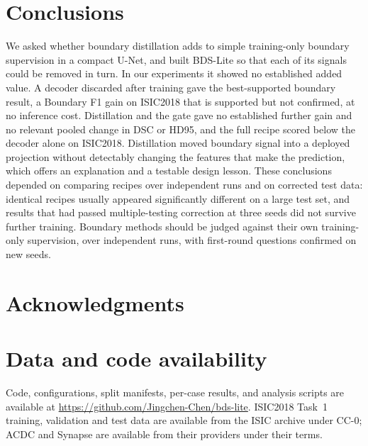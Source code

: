 \documentclass[fleqn,10pt,lineno]{wlpeerj}
\begin{document}
\section*{Conclusions}
We asked whether boundary distillation adds to simple training-only boundary supervision in a compact U-Net, and built BDS-Lite so that each of its signals could be removed in turn. In our experiments it showed no established added value. A decoder discarded after training gave the best-supported boundary result, a Boundary F1 gain on ISIC2018 that is supported but not confirmed, at no inference cost. Distillation and the gate gave no established further gain and no relevant pooled change in DSC or HD95, and the full recipe scored below the decoder alone on ISIC2018. Distillation moved boundary signal into a deployed projection without detectably changing the features that make the prediction, which offers an explanation and a testable design lesson. These conclusions depended on comparing recipes over independent runs and on corrected test data: identical recipes usually appeared significantly different on a large test set, and results that had passed multiple-testing correction at three seeds did not survive further training. Boundary methods should be judged against their own training-only supervision, over independent runs, with first-round questions confirmed on new seeds.


\section*{Acknowledgments}


\section*{Data and code availability}
Code, configurations, split manifests, per-case results, and analysis scripts are available at \url{https://github.com/Jingchen-Chen/bds-lite}. ISIC2018 Task~1 training, validation and test data are available from the ISIC archive under CC-0; ACDC and Synapse are available from their providers under their terms.


\end{document}
